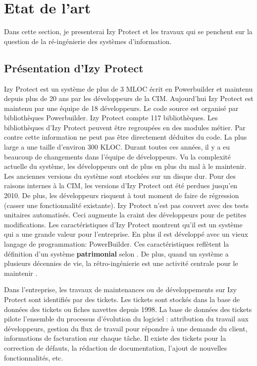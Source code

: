 \documentclass[a4paper]{article}
\begin{document}
\section{Etat de l'art}
\label{sec:stateOfTheArt}
Dans cette section, je presenterai Izy Protect et les travaux qui se penchent sur la question de la ré-ingénierie des systèmes d'information.
\subsection{Présentation d'Izy Protect}
\label{sec:izyProtect}
Izy Protect est un système de plus de 3 MLOC écrit en Powerbuilder et maintenu depuis plus de 20 ans par les développeurs de la CIM. 
Aujourd'hui Izy Protect est maintenu par une équipe de 18 développeurs.
 Le code source est organisé par bibliothèques Powerbuilder. 
Izy Protect compte 117 bibliothèques. Les bibliothèques d'Izy Protect peuvent être regroupées en des modules métier.
 Par contre cette information ne peut pas être directement déduites du code.
 La plus large a une taille d'environ 300 KLOC.
Durant toutes ces années, il y a eu beaucoup de changements dans l'équipe de développeurs. 
Vu la complexité actuelle du système, les développeurs ont de plus en plus du mal à le maintenir.
Les anciennes versions du système sont stockées sur un disque dur.
 Pour des raisons internes à la CIM, les versions d'Izy Protect ont été perdues jusqu'en 2010. 
 De plus, les développeurs risquent à tout moment de faire de régression (casser une fonctionnalité existante). 
Izy Protect  n'est pas couvert avec des tests unitaires automatisés.
Ceci augmente la craint des développeurs pour de petites modifications. 
Les caractéristiques d'Izy Protect montrent qu'il est un système qui a une grande valeur pour l'entreprise.
En plus il est développé avec un vieux langage de programmation: PowerBuilder.
Ces caractéristiques reflètent la définition d'un système \textbf{patrimonial} selon \citet{Deme02a}.
De plus, quand un système a plusieurs décennies de vie, la rétro-ingénierie est une activité centrale pour le maintenir \cite{Deme02a}.

Dans l'entreprise, les travaux de maintenances ou de développements sur Izy Protect sont identifiés par des tickets.
Les tickets sont stockés dans la base de données des tickets ou fiches navettes depuis 1998. 
La base de données des tickets pilote l'ensemble du processus d'évolution du logiciel : attribution du travail aux développeurs, gestion du flux de travail pour répondre à une demande du client, informations de facturation sur chaque tâche.
Il existe des tickets pour la correction de défauts, la rédaction de documentation, l'ajout de nouvelles fonctionnalités, etc. 
\end{document}
